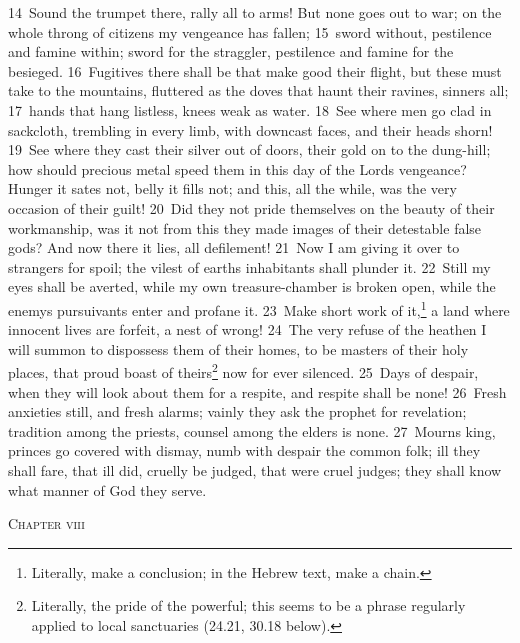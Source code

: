 \documentclass[10pt]{book} %
\begin{document}
\textcolor{benred8}{14}~Sound the trumpet there, rally all to arms! But none goes out to war; on the whole throng of citizens my vengeance has fallen; \textcolor{benred8}{15}~sword without, pestilence and famine within; sword for the straggler, pestilence and famine for the besieged. \textcolor{benred8}{16}~Fugitives there shall be that make good their flight, but these must take to the mountains, fluttered as the doves that haunt their ravines, sinners all; \textcolor{benred8}{17}~hands that hang listless, knees weak as water. \textcolor{benred8}{18}~See where men go clad in sackcloth, trembling in every limb, with downcast faces, and their heads shorn! \textcolor{benred8}{19}~See where they cast their silver out of doors, their gold on to the dung-hill; how should precious metal speed them in this day of the Lord\textquotesingle s vengeance? Hunger it sates not, belly it fills not; and this, all the while, was the very occasion of their guilt! \textcolor{benred8}{20}~Did they not pride themselves on the beauty of their workmanship, was it not from this they made images of their detestable false gods? And now there it lies, all defilement! \textcolor{benred8}{21}~Now I am giving it over to strangers for spoil; the vilest of earth\textquotesingle s inhabitants shall plunder it. \textcolor{benred8}{22}~Still my eyes shall be averted, while my own treasure-chamber is broken open, while the enemy\textquotesingle s pursuivants enter and profane it. \textcolor{benred8}{23}~Make short work of it,\footnote[6]{Literally, \textasciigrave make a conclusion\textquotesingle ; in the Hebrew text, \textasciigrave make a chain\textquotesingle .} a land where innocent lives are forfeit, a nest of wrong! \textcolor{benred8}{24}~The very refuse of the heathen I will summon to dispossess them of their homes, to be masters of their holy places, that proud boast of theirs\footnote[7]{Literally, \textasciigrave the pride of the powerful\textquotesingle ; this seems to be a phrase regularly applied to local sanctuaries (24.21, 30.18 below).} now for ever silenced.
\textcolor{benred8}{25}~Days of despair, when they will look about them for a respite, and respite shall be none! \textcolor{benred8}{26}~Fresh anxieties still, and fresh alarms; vainly they ask the prophet for revelation; tradition among the priests, counsel among the elders is none. \textcolor{benred8}{27}~Mourns king, princes go covered with dismay, numb with despair the common folk; ill they shall fare, that ill did, cruelly be judged, that were cruel judges; they shall know what manner of God they serve.
\begin{large}\begin{center}\textsc{Chapter viii}\end{center}\end{large}
\end{document}
